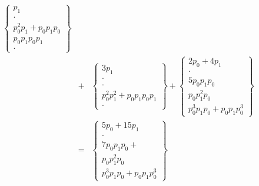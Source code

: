 \documentclass[a4paper,12pt]{article}
\numberwithin{definition}{section}
\numberwithin{lemma}{section}
\numberwithin{proposition}{section}
\numberwithin{theorem}{section}
\numberwithin{grammar}{section}
\numberwithin{program}{section}
\numberwithin{convention}{section}
\numberwithin{corollary}{section}
\numberwithin{principle}{section}
\begin{document}
$$\begin{array}{lcl}
          \begin{Bmatrix} p_1 \\ \cdot \\  p_0^2 p_1  + p_0 p_1 p_0 \\  p_0 p_1 p_0 p_1 \\ \cdot \end{Bmatrix}
          \\
    & + & \begin{Bmatrix} 3 p_1 \\ \cdot \\ \cdot \\ p_0^2 p_1^2 + p_0 p_1 p_0 p_1 \\ \cdot \end{Bmatrix} +
          \begin{Bmatrix} 2 p_0 + 4 p_1 \\ \cdot \\ 5 p_0 p_1 p_0 \\ p_0 p_1^2 p_0 \\ p_0^3 p_1 p_0 + p_0 p_1 p_0^3 \end{Bmatrix}
          \\
    & = & \begin{Bmatrix} 5 p_0 + 15 p_1 \\ \cdot \\ 7 p_0 p_1 p_0 + \\ p_0 p_1^2 p_0 \\ p_0^3 p_1 p_0 + p_0 p_1 p_0^3\end{Bmatrix}
\end{array}
$$
\end{document}
